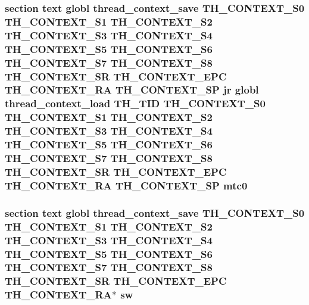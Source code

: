 \hypertarget{mips_2threada_8S_a586efcb1ce14274ebde0a48ee5903ea6}{
\subsubsection[{mtc0}]{\setlength{\rightskip}{0pt plus 5cm}section text globl {\bf thread\-\_\-context\-\_\-save} {\bf T\-H\-\_\-\-C\-O\-N\-T\-E\-X\-T\-\_\-\-S0} {\bf T\-H\-\_\-\-C\-O\-N\-T\-E\-X\-T\-\_\-\-S1} {\bf T\-H\-\_\-\-C\-O\-N\-T\-E\-X\-T\-\_\-\-S2} {\bf T\-H\-\_\-\-C\-O\-N\-T\-E\-X\-T\-\_\-\-S3} {\bf T\-H\-\_\-\-C\-O\-N\-T\-E\-X\-T\-\_\-\-S4} {\bf T\-H\-\_\-\-C\-O\-N\-T\-E\-X\-T\-\_\-\-S5} {\bf T\-H\-\_\-\-C\-O\-N\-T\-E\-X\-T\-\_\-\-S6} {\bf T\-H\-\_\-\-C\-O\-N\-T\-E\-X\-T\-\_\-\-S7} {\bf T\-H\-\_\-\-C\-O\-N\-T\-E\-X\-T\-\_\-\-S8} {\bf T\-H\-\_\-\-C\-O\-N\-T\-E\-X\-T\-\_\-\-S\-R} {\bf T\-H\-\_\-\-C\-O\-N\-T\-E\-X\-T\-\_\-\-E\-P\-C} {\bf T\-H\-\_\-\-C\-O\-N\-T\-E\-X\-T\-\_\-\-R\-A} {\bf T\-H\-\_\-\-C\-O\-N\-T\-E\-X\-T\-\_\-\-S\-P} jr globl {\bf thread\-\_\-context\-\_\-load} {\bf T\-H\-\_\-\-T\-I\-D} {\bf T\-H\-\_\-\-C\-O\-N\-T\-E\-X\-T\-\_\-\-S0} {\bf T\-H\-\_\-\-C\-O\-N\-T\-E\-X\-T\-\_\-\-S1} {\bf T\-H\-\_\-\-C\-O\-N\-T\-E\-X\-T\-\_\-\-S2} {\bf T\-H\-\_\-\-C\-O\-N\-T\-E\-X\-T\-\_\-\-S3} {\bf T\-H\-\_\-\-C\-O\-N\-T\-E\-X\-T\-\_\-\-S4} {\bf T\-H\-\_\-\-C\-O\-N\-T\-E\-X\-T\-\_\-\-S5} {\bf T\-H\-\_\-\-C\-O\-N\-T\-E\-X\-T\-\_\-\-S6} {\bf T\-H\-\_\-\-C\-O\-N\-T\-E\-X\-T\-\_\-\-S7} {\bf T\-H\-\_\-\-C\-O\-N\-T\-E\-X\-T\-\_\-\-S8} {\bf T\-H\-\_\-\-C\-O\-N\-T\-E\-X\-T\-\_\-\-S\-R} {\bf T\-H\-\_\-\-C\-O\-N\-T\-E\-X\-T\-\_\-\-E\-P\-C} {\bf T\-H\-\_\-\-C\-O\-N\-T\-E\-X\-T\-\_\-\-R\-A} {\bf T\-H\-\_\-\-C\-O\-N\-T\-E\-X\-T\-\_\-\-S\-P} mtc0}}\label{mips_2threada_8S_a586efcb1ce14274ebde0a48ee5903ea6}
\hypertarget{mips_2threada_8S_a0616a0b0d185f884abf396081cef7c0d}{
\subsubsection[{sw}]{\setlength{\rightskip}{0pt plus 5cm}section text globl {\bf thread\-\_\-context\-\_\-save} {\bf T\-H\-\_\-\-C\-O\-N\-T\-E\-X\-T\-\_\-\-S0} {\bf T\-H\-\_\-\-C\-O\-N\-T\-E\-X\-T\-\_\-\-S1} {\bf T\-H\-\_\-\-C\-O\-N\-T\-E\-X\-T\-\_\-\-S2} {\bf T\-H\-\_\-\-C\-O\-N\-T\-E\-X\-T\-\_\-\-S3} {\bf T\-H\-\_\-\-C\-O\-N\-T\-E\-X\-T\-\_\-\-S4} {\bf T\-H\-\_\-\-C\-O\-N\-T\-E\-X\-T\-\_\-\-S5} {\bf T\-H\-\_\-\-C\-O\-N\-T\-E\-X\-T\-\_\-\-S6} {\bf T\-H\-\_\-\-C\-O\-N\-T\-E\-X\-T\-\_\-\-S7} {\bf T\-H\-\_\-\-C\-O\-N\-T\-E\-X\-T\-\_\-\-S8} {\bf T\-H\-\_\-\-C\-O\-N\-T\-E\-X\-T\-\_\-\-S\-R} {\bf T\-H\-\_\-\-C\-O\-N\-T\-E\-X\-T\-\_\-\-E\-P\-C} {\bf T\-H\-\_\-\-C\-O\-N\-T\-E\-X\-T\-\_\-\-R\-A}$\ast$ sw}}\label{mips_2threada_8S_a0616a0b0d185f884abf396081cef7c0d}
